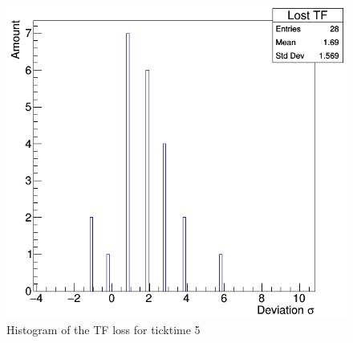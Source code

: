 \begin{figure}
	\centering
	\includegraphics[scale=0.5]{./graphics/ex3_histogram.png}
	\caption{Histogram of the TF loss for ticktime 5}
	\label{fig:Ex3Histogram}
\end{figure}

\newpage




